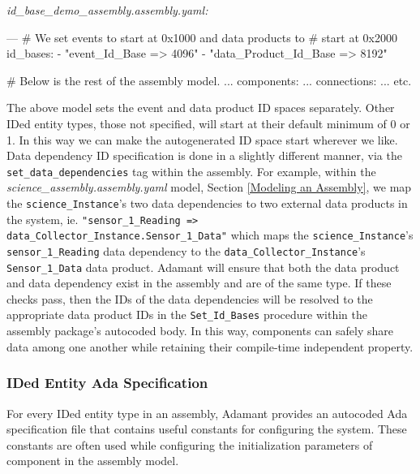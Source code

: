 \textit{id\_base\_demo\_assembly.assembly.yaml:}
\vspace{5mm} %
\begin{yamlcode}
---
# We set events to start at  0x1000 and data products to 
# start at 0x2000
id_bases: 
  - "event_Id_Base => 4096"
  - "data_Product_Id_Base => 8192"

# Below is the rest of the assembly model.
  ...
components:
  ... 
connections: 
  ...
  etc.
\end{yamlcode}
\vspace{5mm} %

The above model sets the event and data product ID spaces separately. Other IDed entity types, those not specified, will start at their default minimum of 0 or 1. In this way we can make the autogenerated ID space start wherever we like. \\

Data dependency ID specification is done in a slightly different manner, via the \texttt{set\_data\_dependencies} tag within the assembly. For example, within the \textit{science\_assembly.assembly.yaml} model, Section \ref{Modeling an Assembly}, we map the \texttt{science\_Instance}'s two data dependencies to two external data products in the system, ie. \texttt{"sensor\_1\_Reading => data\_Collector\_Instance.Sensor\_1\_Data"} which maps the \texttt{science\_Instance}'s \texttt{sensor\_1\_Reading} data dependency to the \texttt{data\_Collector\_Instance}'s \texttt{Sensor\_1\_Data} data product. Adamant will ensure that both the data product and data dependency exist in the assembly and are of the same type. If these checks pass, then the IDs of the data dependencies will be resolved to the appropriate data product IDs in the \texttt{Set\_Id\_Bases} procedure within the assembly package's autocoded body. In this way, components can safely share data among one another while retaining their compile-time independent property.

\subsubsection{IDed Entity Ada Specification}

For every IDed entity type in an assembly, Adamant provides an autocoded Ada specification file that contains useful constants for configuring the system. These constants are often used while configuring the initialization parameters of component in the assembly model. \\

